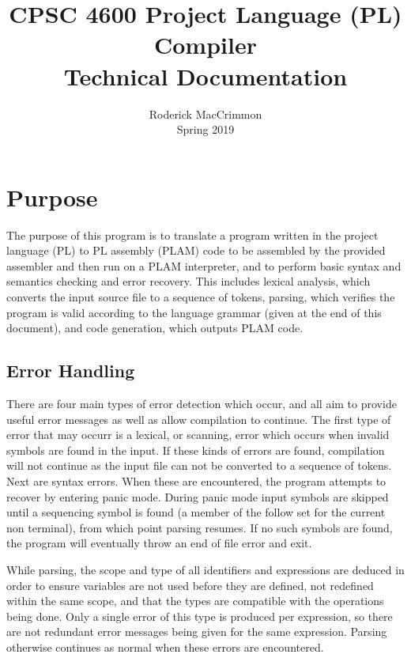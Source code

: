 \documentclass{article}
\begin{document}
\title{CPSC 4600 Project Language (PL) Compiler \\ \LARGE Technical Documentation}
\author{Roderick MacCrimmon \\ Spring 2019}
\date{}
\maketitle

\section{Purpose}

The purpose of this program is to translate a program written in the project language (PL) to PL assembly (PLAM) code to be assembled by the provided assembler and then run on a PLAM interpreter, and to perform basic syntax and semantics checking and error recovery. This includes lexical analysis, which converts the input source file to a sequence of tokens, parsing, which verifies the program is valid according to the language grammar (given at the end of this document), and code generation, which outputs PLAM code. 

\subsection{Error Handling}

There are four main types of error detection which occur, and all aim to provide useful error messages as well as allow compilation to continue. The first type of error that may occurr is a lexical, or scanning, error which occurs when invalid symbols are found in the input. If these kinds of errors are found, compilation will not continue as the input file can not be converted to a sequence of tokens. Next are syntax errors. When these are encountered, the program attempts to recover by entering panic mode. During panic mode input symbols are skipped until a sequencing symbol is found (a member of the follow set for the current non terminal), from which point parsing resumes. If no such symbols are found, the program will eventually throw an end of file error and exit. 

While parsing, the scope and type of all identifiers and expressions are deduced in order to ensure variables are not used before they are defined, not redefined within the same scope, and that the types are compatible with the operations being done. Only a single error of this type is produced per expression, so there are not redundant error messages being given for the same expression. Parsing otherwise continues as normal when these errors are encountered.
\end{document}
